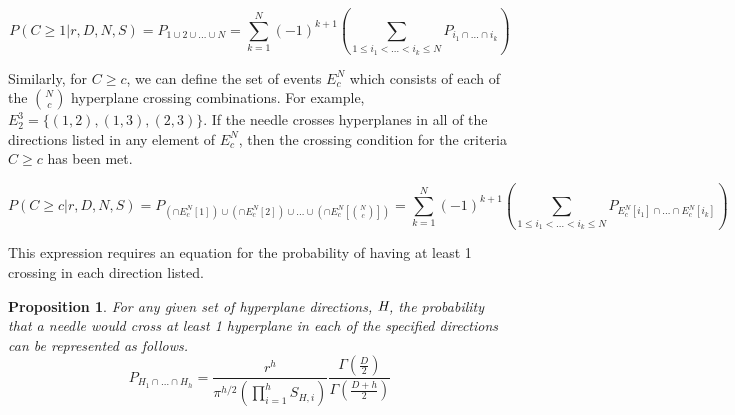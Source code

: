 \documentclass{article}
\newtheorem{proposition}{Proposition}
\begin{document}
\begin{equation}
	P(C\ge 1|r, D, N, S) = P_{1\cup2\cup\hdots\cup N} = \sum_{k=1}^N (-1)^{k+1}\left(\sum_{1\le i_1 < \hdots < i_k \le N}P_{i_1 \cap \hdots \cap i_k} \right)
\end{equation}

Similarly, for $C\ge c$, we can define the set of events $E_c^N$ which consists of each of the
$N \choose c$ hyperplane crossing combinations. For example, $E_2^3=\{(1,2), (1,3), (2,3)\}$.
If the needle crosses hyperplanes in all of the directions listed in any element of $E_c^N$,
then the crossing condition for the criteria $C \ge c$ has been met.

\begin{equation}
	P(C\ge c|r, D, N, S) = P_{(\cap E_c^N[1])\cup(\cap E_c^N[2])\cup\hdots\cup(\cap E_c^N[{N \choose c}])} = \sum_{k=1}^N (-1)^{k+1}\left(\sum_{1\le i_1 < \hdots < i_k \le N}P_{E_c^N[i_1] \cap \hdots \cap E_c^N[i_k]} \right)
\end{equation}

This expression requires an equation for the probability of having at least 1 crossing in
each direction listed. 

\begin{proposition}
	For any given set of hyperplane directions, $\emph{H}$, the probability that a needle would cross
	at least 1 hyperplane in each of the specified directions can be represented as follows.
	\begin{equation}
		P_{H_1 \cap \hdots \cap H_h} = \frac{r^h }{ \pi^{h/2} (\prod_{i=1}^h S_{H,i}) }\frac{\Gamma(\frac{D}{2})}{\Gamma(\frac{D+h}{2})}
	\end{equation}
\end{proposition}
\end{document}
